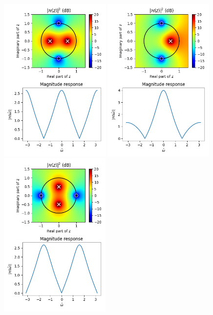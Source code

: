     \begin{figure}
        \begin{center}
            \includegraphics[width=0.49\textwidth]{code/026_iir/ex1.png}
            \includegraphics[width=0.49\textwidth]{code/026_iir/ex2.png}
            \includegraphics[width=0.49\textwidth]{code/026_iir/ex3.png}

\end{center}
\end{figure}
